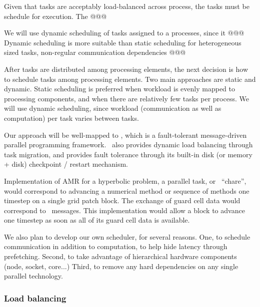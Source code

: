 \documentclass{article}
\begin{document}
Given that tasks are acceptably load-balanced across process, the
tasks must be schedule for execution.  The @@@


We will use dynamic scheduling of tasks assigned to a processes, since
it @@@  Dynamic scheduling is more suitable than static scheduling for
heterogeneous sized tasks, non-regular communication dependencies @@@


After tasks are distributed among processing elements, the next
decision is how to schedule tasks among processing elements.  Two main
approaches are static and dynamic.  Static scheduling is preferred
when workload is evenly mapped to processing components, and when
there are relatively few tasks per process.  We will use dynamic
scheduling, since workload (communication as well as computation) per
task varies between tasks.

 Our approach will be well-mapped to \charm,
which is a fault-tolerant message-driven parallel programming
framework.  \charm\ also provides dynamic load balancing through task
migration, and provides fault tolerance through its built-in disk (or
memory + disk) checkpoint / restart mechanism.

Implementation of AMR for a hyperbolic problem, a parallel task, or
\charm\  ``chare'', would correspond to advancing a numerical method or
sequence of methods one timestep on a single grid patch block.  The
exchange of guard cell data would correspond to \charm\  messages.
This implementation would allow a block to advance one timestep as
soon as all of its guard cell data is available.


We also plan to develop our own scheduler, for several reasons.  One,
to schedule communication in addition to computation, to help hide
latency through prefetching.  Second, to take advantage of
hierarchical hardware components (node, socket, core...)  Third, to
remove any hard dependencies on any single parallel technology.

\subsubsection{Load balancing} \label{ss:design-balancing}
\end{document}
